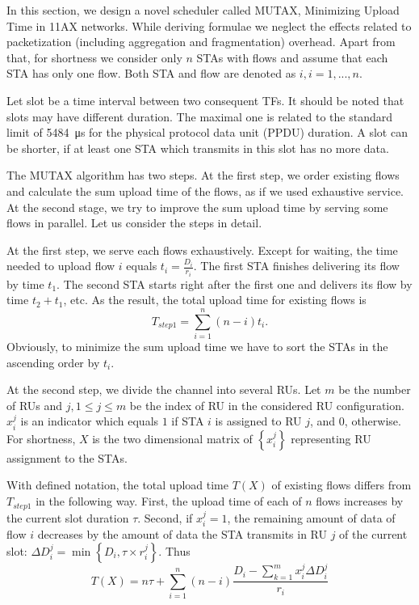 In this section, we design a novel scheduler called MUTAX, Minimizing Upload Time in 11AX networks. While deriving formulae we neglect the effects related to packetization (including aggregation and fragmentation) overhead. Apart from that, for shortness we consider only $n$ STAs with flows and assume that each STA has only one flow. Both STA and flow are denoted as $i, i=1,...,n$.

Let slot be a time interval between two consequent TFs.
It should be noted that slots may have different duration. The maximal one is related to the standard limit of \SI{5484}{\us} for the physical protocol data unit (PPDU) duration. A slot can be shorter, if at least one STA which transmits in this slot has no more data.

The MUTAX algorithm has two steps. At the first step, we order existing flows and calculate the sum upload time of the flows, as if we used exhaustive service.
At the second stage, we try to improve the sum upload time by serving some flows in parallel.
Let us consider the steps in detail.

At the first step, we serve each flows exhaustively.
Except for waiting, the time needed to upload flow $i$ equals $t_i = \frac{D_i}{r_{i}}$. %
The first STA finishes delivering its flow by time $t_1$.
The second STA starts right after the first one and delivers its flow by time $t_2 + t_1$, etc.
As the result, the total upload time for existing flows is
\[ T_{step1} = \sum_{i = 1}^{n} \left(n - i\right) t_i. \]
Obviously, to minimize the sum upload time we have to sort the STAs in the ascending order by $t_i$.

At the second step, we divide the channel into several RUs.   
Let $m$ be the number of RUs and $j, 1\le j \le m$ be the index of RU in the considered RU configuration.  
$x_i^j$ is an indicator which equals $1$ if STA $i$ is assigned to RU $j$, and $0$, otherwise.
For shortness, $X$ is the two dimensional matrix of $\left\{x_i^j\right\}$ representing RU assignment to the STAs. 

With defined notation, the total upload time $T\left(X\right) $ of existing flows differs from $T_{step1}$ in the following way. First, the upload time of each of $n$ flows increases by  the current slot duration $\tau$. Second, if $x_i^j=1$, the remaining amount of data of flow $i$ decreases by the amount of data the STA transmits in RU $j$ of the current slot: $\Delta D_i^j = \min\left\{D_i, \tau \times r_{i}^{j}\right\}$. Thus  
\[ T\left(X\right) = n \tau + \sum_{i = 1}^{n} \left(n - i\right) \frac{D_i -  \sum_{k = 1}^{m} x_i^j \Delta D_i^j}{r_{i}} \]



